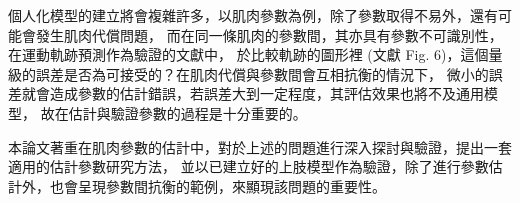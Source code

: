 個人化模型的建立將會複雜許多，以肌肉參數為例，除了參數取得不易外，還有可能會發生肌肉代償問題，
而在同一條肌肉的參數間，其亦具有參數不可識別性，在運動軌跡預測作為驗證的文獻中，
於比較軌跡的圖形裡 (文獻 Fig. 6)，這個量級的誤差是否為可接受的？在肌肉代償與參數間會互相抗衡的情況下，
微小的誤差就會造成參數的估計錯誤，若誤差大到一定程度，其評估效果也將不及通用模型，
故在估計與驗證參數的過程是十分重要的。

本論文著重在肌肉參數的估計中，對於上述的問題進行深入探討與驗證，提出一套適用的估計參數研究方法，
並以已建立好的上肢模型作為驗證，除了進行參數估計外，也會呈現參數間抗衡的範例，來顯現該問題的重要性。

\clearpage
